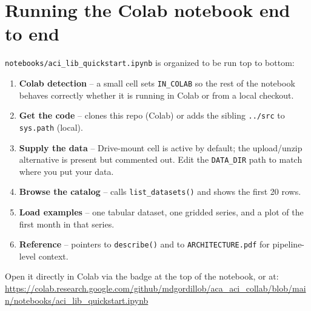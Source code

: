 \documentclass[11pt]{article}
\begin{document}
\section{Running the Colab notebook end to end}
\label{sec:notebook}

\texttt{notebooks/aci\_lib\_quickstart.ipynb} is organized to be run
top to bottom:

\begin{enumerate}[leftmargin=*]
\item \textbf{Colab detection} -- a small cell sets \texttt{IN\_COLAB} so
  the rest of the notebook behaves correctly whether it is running in
  Colab or from a local checkout.
\item \textbf{Get the code} -- clones this repo (Colab) or adds the
  sibling \texttt{../src} to \texttt{sys.path} (local).
\item \textbf{Supply the data} -- Drive-mount cell is active by default;
  the upload/unzip alternative is present but commented out. Edit the
  \texttt{DATA\_DIR} path to match where you put your data.
\item \textbf{Browse the catalog} -- calls \texttt{list\_datasets()} and
  shows the first 20 rows.
\item \textbf{Load examples} -- one tabular dataset, one gridded series,
  and a plot of the first month in that series.
\item \textbf{Reference} -- pointers to \texttt{describe()} and to
  \texttt{ARCHITECTURE.pdf} for pipeline-level context.
\end{enumerate}

Open it directly in Colab via the badge at the top of the notebook, or at:
\url{https://colab.research.google.com/github/mdgordillob/aca_aci_collab/blob/main/notebooks/aci_lib_quickstart.ipynb}
\end{document}
